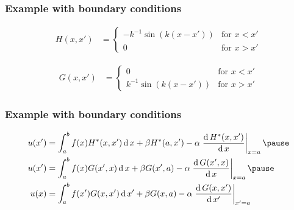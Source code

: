 \documentclass[12 pt, compress, handout, intlimits]{beamer}
\renewcommand{\d}{\operatorname{d}}
\begin{document}
\begin{frame}[fragile]
    \frametitle{Example with boundary conditions}
     
    \begin{align*}
        H(x,x') &= 
            \begin{cases} 
                - k^{-1} \sin(k (x - x')) & \text{for } x < x'
                \\
                0 & \text{for } x > x'
            \end{cases} 
    \end{align*}

    \begin{align*}
        G(x,x') &= 
            \begin{cases} 
                0 & \text{for } x < x'
                \\
                k^{-1} \sin(k (x - x')) & \text{for } x > x'
            \end{cases} 
    \end{align*}

\end{frame}


\begin{frame}[fragile]
    \frametitle{Example with boundary conditions}
 
    \begin{align*}
        u(x') &= \int_a^b f(x) H^*(x,x') \d x + \beta H^*(a,x') - \alpha \left. \frac{\d H^*(x,x')}{\d x} \right|_{x=a}
        \pause
        \\
        u(x') &= \int_a^b f(x) G(x',x) \d x + \beta G(x',a) - \alpha \left. \frac{\d G(x',x)}{\d x} \right|_{x=a}
        \pause
        \\
        u(x) &= \int_a^b f(x') G(x,x') \d x' + \beta G(x,a) - \alpha \left.\frac{\d G(x,x')}{\d x'}\right|_{x'=a}
    \end{align*}
    
\end{frame}
\end{document}
